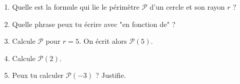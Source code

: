 
\begin{enumerate}
\item Quelle est la formule qui lie le périmètre $\mathscr P$ d'un cercle et son rayon $r$ ?
\item Quelle phrase peux tu écrire avec "en fonction de" ?
\item Calcule $\mathscr P$ pour $r=5$. On écrit alors $\mathscr{P}(5)$.
\item Calcule $\mathscr{P}(2)$.
\item Peux tu calculer $\mathscr{P}(-3)$ ? Justifie.
\end{enumerate}
